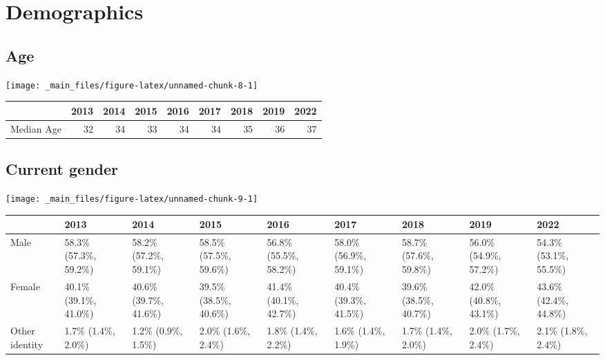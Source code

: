 \documentclass[
]{book}
\begin{document}
\hypertarget{demographics}{%
\section{Demographics}\label{demographics}}

\hypertarget{age}{%
\subsection{Age}\label{age}}

\texttt{[image: \_main\_files/figure-latex/unnamed-chunk-8-1]}

\begin{table}
\centering
\begin{tabular}[t]{>{}l|>{}r|>{}r|>{}r|>{}r|>{}r|>{}r|>{}r|>{}r}
\hline
  & 2013 & 2014 & 2015 & 2016 & 2017 & 2018 & 2019 & 2022\\
\hline
Median Age & 32 & 34 & 33 & 34 & 34 & 35 & 36 & 37\\
\hline
\end{tabular}
\end{table}

\hypertarget{current-gender}{%
\subsection{Current gender}\label{current-gender}}

\texttt{[image: \_main\_files/figure-latex/unnamed-chunk-9-1]}

\begin{table}
\centering
\begin{tabular}[t]{>{}l|>{}l|>{}l|>{}l|>{}l|>{}l|>{}l|>{}l|>{}l}
\hline
  & 2013 & 2014 & 2015 & 2016 & 2017 & 2018 & 2019 & 2022\\
\hline
Male & 58.3\% (57.3\%, 59.2\%) & 58.2\% (57.2\%, 59.1\%) & 58.5\% (57.5\%, 59.6\%) & 56.8\% (55.5\%, 58.2\%) & 58.0\% (56.9\%, 59.1\%) & 58.7\% (57.6\%, 59.8\%) & 56.0\% (54.9\%, 57.2\%) & 54.3\% (53.1\%, 55.5\%)\\
\hline
Female & 40.1\% (39.1\%, 41.0\%) & 40.6\% (39.7\%, 41.6\%) & 39.5\% (38.5\%, 40.6\%) & 41.4\% (40.1\%, 42.7\%) & 40.4\% (39.3\%, 41.5\%) & 39.6\% (38.5\%, 40.7\%) & 42.0\% (40.8\%, 43.1\%) & 43.6\% (42.4\%, 44.8\%)\\
\hline
Other identity & 1.7\% (1.4\%, 2.0\%) & 1.2\% (0.9\%, 1.5\%) & 2.0\% (1.6\%, 2.4\%) & 1.8\% (1.4\%, 2.2\%) & 1.6\% (1.4\%, 1.9\%) & 1.7\% (1.4\%, 2.0\%) & 2.0\% (1.7\%, 2.4\%) & 2.1\% (1.8\%, 2.4\%)\\
\hline
\end{tabular}
\end{table}
\end{document}
